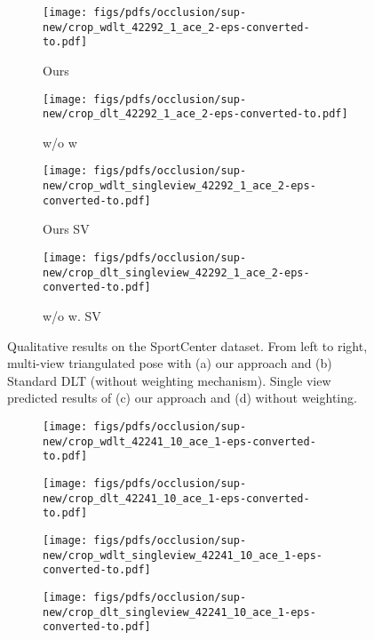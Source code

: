 \documentclass[runningheads]{llncs}
\begin{document}
\begin{figure*}
	\begin{subfigure}[b]{0.23\linewidth}        \centering
		\texttt{[image: figs/pdfs/occlusion/sup-new/crop\_wdlt\_42292\_1\_ace\_2-eps-converted-to.pdf]}
		\caption{Ours}
\end{subfigure}
	\begin{subfigure}[b]{0.23\linewidth}        \centering
		\texttt{[image: figs/pdfs/occlusion/sup-new/crop\_dlt\_42292\_1\_ace\_2-eps-converted-to.pdf]}
		\caption{w/o w}
\end{subfigure}
	\begin{subfigure}[b]{0.23\linewidth}        \centering
		\texttt{[image: figs/pdfs/occlusion/sup-new/crop\_wdlt\_singleview\_42292\_1\_ace\_2-eps-converted-to.pdf]}
		\caption{Ours SV}
\end{subfigure}
	\begin{subfigure}[b]{0.23\linewidth}        \centering
		\texttt{[image: figs/pdfs/occlusion/sup-new/crop\_dlt\_singleview\_42292\_1\_ace\_2-eps-converted-to.pdf]}
		\caption{\small w/o w. SV}
\end{subfigure}
	\vspace{-0.3cm}
	\caption{\small Qualitative results on the SportCenter dataset. From left to right, multi-view triangulated pose with (a) our approach and (b) Standard DLT (without weighting mechanism). Single view predicted results of (c) our approach and (d) without weighting. }
	\label{fig:occlusion_images_2}
\end{figure*} \begin{figure*}
	\centering
	
	\begin{subfigure}[b]{0.235\linewidth}        \centering
		\texttt{[image: figs/pdfs/occlusion/sup-new/crop\_wdlt\_42241\_10\_ace\_1-eps-converted-to.pdf]}
	\end{subfigure}
	\begin{subfigure}[b]{0.235\linewidth}        \centering
		\texttt{[image: figs/pdfs/occlusion/sup-new/crop\_dlt\_42241\_10\_ace\_1-eps-converted-to.pdf]}
	\end{subfigure}
	\begin{subfigure}[b]{0.235\linewidth}        \centering
		\texttt{[image: figs/pdfs/occlusion/sup-new/crop\_wdlt\_singleview\_42241\_10\_ace\_1-eps-converted-to.pdf]}
	\end{subfigure}
	\begin{subfigure}[b]{0.235\linewidth}        \centering
		\texttt{[image: figs/pdfs/occlusion/sup-new/crop\_dlt\_singleview\_42241\_10\_ace\_1-eps-converted-to.pdf]}
	\end{subfigure} \\   


\end{figure*}
\end{document}
